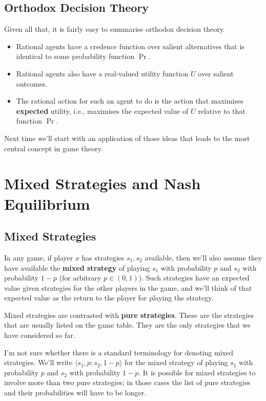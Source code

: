 \documentclass[openany]{book}
\begin{document}
\section{Orthodox Decision Theory}
Given all that, it is fairly easy to summarise orthodox decision theory.

\begin{itemize}
\item Rational agents have a credence function over salient alternatives that is identical to some probability function $\Pr$.
\item Rational agents also have a real-valued utility function $U$ over salient outcomes.
\item The rational action for such an agent to do is the action that maximises \textbf{expected} utility, i.e., maximises the expected value of $U$ relative to that function $\Pr$.
\end{itemize}
Next time we'll start with an application of those ideas that leads to the most central concept in game theory.

%
%
%
%
%
%


\chapter{Mixed Strategies and Nash Equilibrium}
\section{Mixed Strategies}

In any game, if player $x$ has strategies $s_1, s_2$ available, then we'll also assume they have available the \textbf{mixed strategy} of playing $s_1$ with probability $p$ and $s_2$ with probability $1-p$ (for arbitrary $p \in (0, 1)$). Such strategies have an expected value given strategies for the other players in the game, and we'll think of that expected value as the return to the player for playing the strategy.

Mixed strategies are contrasted with \textbf{pure strategies}. These are the strategies that are usually listed on the game table. They are the only strategies that we have considered so far.

I'm not sure whether there is a standard terminology for denoting mixed strategies. We'll write $\langle s_1, p; s_2, 1-p \rangle$ for the mixed strategy of playing $s_1$ with probability $p$ and $s_2$ with probability $1-p$. It is possible for mixed strategies to involve more than two pure strategies; in those cases the list of pure strategies and their probabilities will have to be longer.
\end{document}
